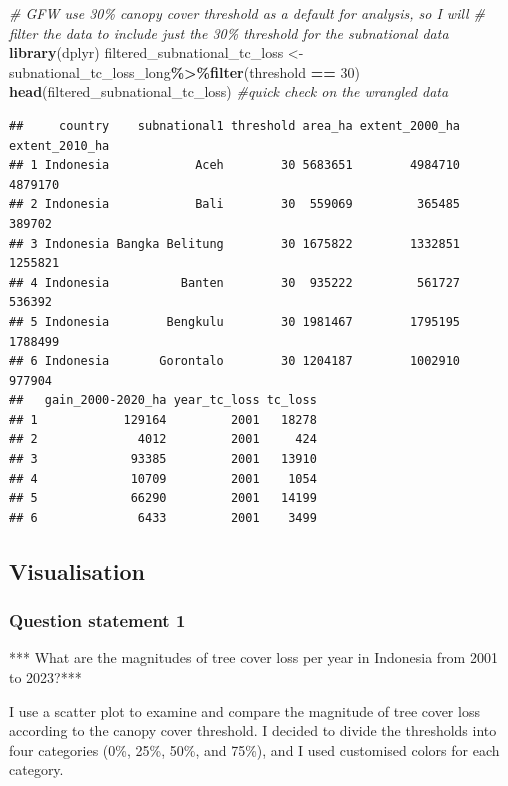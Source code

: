 \documentclass[
]{article}
\newenvironment{Shaded}{\begin{snugshade}}{\end{snugshade}}
\newcommand{\CommentTok}[1]{\textcolor[rgb]{0.56,0.35,0.01}{\textit{#1}}}
\newcommand{\DecValTok}[1]{\textcolor[rgb]{0.00,0.00,0.81}{#1}}
\newcommand{\FunctionTok}[1]{\textcolor[rgb]{0.13,0.29,0.53}{\textbf{#1}}}
\newcommand{\NormalTok}[1]{#1}
\newcommand{\OtherTok}[1]{\textcolor[rgb]{0.56,0.35,0.01}{#1}}
\newcommand{\SpecialCharTok}[1]{\textcolor[rgb]{0.81,0.36,0.00}{\textbf{#1}}}
\begin{document}
\begin{Shaded}
\begin{Highlighting}[]
\CommentTok{\# GFW use 30\% canopy cover threshold as a default for analysis, so I will}
\CommentTok{\# filter the data to include just the 30\% threshold for the subnational data}
\FunctionTok{library}\NormalTok{(dplyr)}
\NormalTok{filtered\_subnational\_tc\_loss }\OtherTok{\textless{}{-}}\NormalTok{ subnational\_tc\_loss\_long}\SpecialCharTok{\%\textgreater{}\%}\FunctionTok{filter}\NormalTok{(threshold }\SpecialCharTok{==} \DecValTok{30}\NormalTok{)}
\FunctionTok{head}\NormalTok{(filtered\_subnational\_tc\_loss) }\CommentTok{\#quick check on the wrangled data}
\end{Highlighting}
\end{Shaded}

\begin{verbatim}
##     country    subnational1 threshold area_ha extent_2000_ha extent_2010_ha
## 1 Indonesia            Aceh        30 5683651        4984710        4879170
## 2 Indonesia            Bali        30  559069         365485         389702
## 3 Indonesia Bangka Belitung        30 1675822        1332851        1255821
## 4 Indonesia          Banten        30  935222         561727         536392
## 5 Indonesia        Bengkulu        30 1981467        1795195        1788499
## 6 Indonesia       Gorontalo        30 1204187        1002910         977904
##   gain_2000-2020_ha year_tc_loss tc_loss
## 1            129164         2001   18278
## 2              4012         2001     424
## 3             93385         2001   13910
## 4             10709         2001    1054
## 5             66290         2001   14199
## 6              6433         2001    3499
\end{verbatim}

\subsection{Visualisation}\label{visualisation}

\subsubsection{Question statement 1}\label{question-statement-1}

*** What are the magnitudes of tree cover loss per year in Indonesia
from 2001 to 2023?***

I use a scatter plot to examine and compare the magnitude of tree cover
loss according to the canopy cover threshold. I decided to divide the
thresholds into four categories (0\%, 25\%, 50\%, and 75\%), and I used
customised colors for each category.
\end{document}
